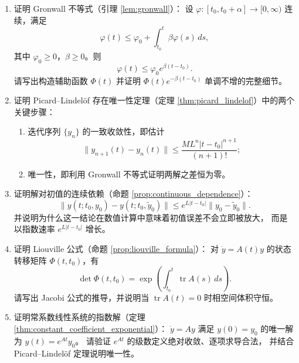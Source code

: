 \begin{enumerate}[leftmargin=3em, label=\textbf{题 \arabic*}]
    \item 证明 Gronwall 不等式（引理 \ref{lem:gronwall}）：
    设 $\varphi:[t_0,t_0+\alpha]\to[0,\infty)$ 连续，满足
    \[
    \varphi(t)\le\varphi_0+\int_{t_0}^{t}\beta\varphi(s)\,ds,
    \]
    其中 $\varphi_0\ge0$，$\beta\ge0$。则
    \[
    \varphi(t)\le\varphi_0e^{\beta(t-t_0)}.
    \]
    请写出构造辅助函数 $\Phi(t)$ 并证明 $\Phi(t)e^{-\beta(t-t_0)}$ 单调不增的完整细节。

    \item 证明 Picard--Lindelöf 存在唯一性定理（定理 \ref{thm:picard_lindelof}）中的两个关键步骤：
    \begin{enumerate}[label=(\roman*)]
        \item 迭代序列 $\{y_n\}$ 的一致收敛性，即估计
              \[
              \|y_{n+1}(t)-y_n(t)\|\le\frac{ML^n|t-t_0|^{n+1}}{(n+1)!};
              \]
        \item 唯一性，即利用 Gronwall 不等式证明两解之差恒为零。
    \end{enumerate}

    \item 证明解对初值的连续依赖（命题 \ref{prop:continuous_dependence}）：
    \[
    \|y(t;t_0,y_0)-y(t;t_0,\tilde{y}_0)\|\le e^{L|t-t_0|}\|y_0-\tilde{y}_0\|.
    \]
    并说明为什么这一结论在数值计算中意味着初值误差不会立即被放大，
    而是以指数速率 $e^{L|t-t_0|}$ 增长。

    \item 证明 Liouville 公式（命题 \ref{prop:liouville_formula}）：
    对 $\dot{y}=A(t)y$ 的状态转移矩阵 $\Phi(t,t_0)$，有
    \[
    \det\Phi(t,t_0)=\exp\left(\int_{t_0}^{t}\operatorname{tr}A(s)\,ds\right).
    \]
    请写出 Jacobi 公式的推导，并说明当 $\operatorname{tr}A(t)=0$ 时相空间体积守恒。

    \item 证明常系数线性系统的指数解（定理 \ref{thm:constant_coefficient_exponential}）：
    $\dot{y}=Ay$ 满足 $y(0)=y_0$ 的唯一解为 $y(t)=e^{At}y_0$。
    请验证 $e^{At}$ 的级数定义绝对收敛、逐项求导合法，
    并结合 Picard--Lindelöf 定理说明唯一性。


\end{enumerate}
